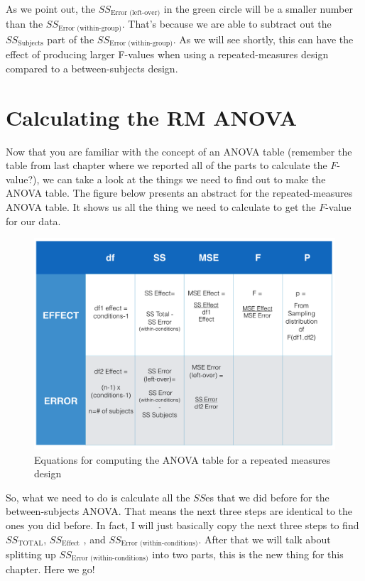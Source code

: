 \documentclass[]{book}
\begin{document}
As we point out, the \(SS_\text{Error (left-over)}\) in the green circle will be a smaller number than the \(SS_\text{Error (within-group)}\). That's because we are able to subtract out the \(SS_\text{Subjects}\) part of the \(SS_\text{Error (within-group)}\). As we will see shortly, this can have the effect of producing larger F-values when using a repeated-measures design compared to a between-subjects design.

\hypertarget{calculating-the-rm-anova}{%
\section{Calculating the RM ANOVA}\label{calculating-the-rm-anova}}

Now that you are familiar with the concept of an ANOVA table (remember the table from last chapter where we reported all of the parts to calculate the \(F\)-value?), we can take a look at the things we need to find out to make the ANOVA table. The figure below presents an abstract for the repeated-measures ANOVA table. It shows us all the thing we need to calculate to get the \(F\)-value for our data.

\begin{figure}
\centering
\includegraphics{figures/RMANOVA_table.png}
\caption{\label{fig:8rmtable}Equations for computing the ANOVA table for a repeated measures design}
\end{figure}

So, what we need to do is calculate all the \(SS\)es that we did before for the between-subjects ANOVA. That means the next three steps are identical to the ones you did before. In fact, I will just basically copy the next three steps to find \(SS_\text{TOTAL}\), \(SS_\text{Effect}\) , and \(SS_\text{Error (within-conditions)}\). After that we will talk about splitting up \(SS_\text{Error (within-conditions)}\) into two parts, this is the new thing for this chapter. Here we go!
\end{document}
